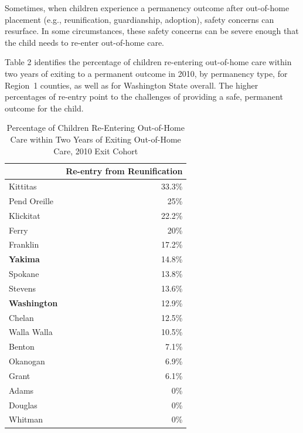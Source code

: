 \documentclass{article}\usepackage[]{graphicx}\usepackage[]{color}
\begin{document}
Sometimes, when children experience a permanency outcome after out-of-home placement (e.g., reunification, guardianship, adoption), safety concerns can resurface. In some circumstances, these safety concerns can be severe enough that the child needs to re-enter out-of-home care.

Table 2 identifies the percentage of children re-entering out-of-home care within two years of exiting to a permanent outcome in 2010, by permanency type, for Region~1 counties, as well as for Washington State overall. The higher percentages of re-entry point to the challenges of providing a safe, permanent outcome for the child.
\vspace{12pt}
\nopagebreak[3]
\begin{table}[ht]
\centering
\caption{Percentage of Children Re-Entering Out-of-Home Care within Two Years of Exiting Out-of-Home Care, 2010 Exit Cohort} 
\begin{tabular}{lr}
  \toprule
 & Re-entry from Reunification \\ 
  \midrule
Kittitas & 33.3\% \\ 
  Pend Oreille & 25\% \\ 
  Klickitat & 22.2\% \\ 
  Ferry & 20\% \\ 
  Franklin & 17.2\% \\ 
  \textbf{Yakima} & 14.8\% \\ 
  Spokane & 13.8\% \\ 
  Stevens & 13.6\% \\ 
  \textbf{Washington} & 12.9\% \\ 
  Chelan & 12.5\% \\ 
  Walla Walla & 10.5\% \\ 
  Benton & 7.1\% \\ 
  Okanogan & 6.9\% \\ 
  Grant & 6.1\% \\ 
  Adams & 0\% \\ 
  Douglas & 0\% \\ 
  Whitman & 0\% \\ 
   \bottomrule
\end{tabular}
\end{table}



\newpage

\end{document}
